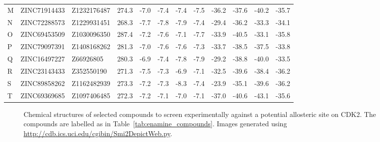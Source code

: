 \begin{sidewaystable}
\begin{small}
\begin{tabular}{lllrrrrrrrrr}
M     & ZINC71914433 & Z1232176487 & 274.3 & -7.0  & -7.4  & -7.4  & -7.5  & -36.2 & -37.6 & -40.2 & -35.7 \\
N     & ZINC72288573 & Z1229931451 & 268.3 & -7.7  & -7.8  & -7.9  & -7.4  & -29.4 & -36.2 & -33.3 & -34.1 \\
O     & ZINC69453509 & Z1030096350 & 287.4 & -7.2  & -7.6  & -7.1  & -7.7  & -33.9 & -40.5 & -33.1 & -35.8 \\
P     & ZINC79097391 & Z1408168262 & 281.3 & -7.0  & -7.6  & -7.6  & -7.3  & -33.7 & -38.5 & -37.5 & -33.8 \\
Q     & ZINC16497227 & Z66926805 & 280.3 & -6.9  & -7.4  & -7.8  & -7.9  & -29.2 & -38.8 & -40.0 & -33.5 \\
R     & ZINC23143433 & Z352550190  & 271.3 & -7.5  & -7.3  & -6.9  & -7.1  & -32.5 & -39.6 & -38.4 & -36.2 \\
S     & ZINC89858262 & Z1162482939 & 273.3 & -7.2  & -7.3  & -8.3  & -7.4  & -23.9 & -35.1 & -39.6 & -36.2 \\
T     & ZINC69369685 & Z1097406485 & 272.3 & -7.2  & -7.1  & -7.0  & -7.1  & -37.0 & -40.6 & -43.1 & -35.6 \\
\hline
\end{tabular}
\end{small}

\caption{Selected compounds to screen experimentally against a potential allosteric site on CDK2.
ZINC12 ID is the ID in the ZINC12 database (\url{http://zinc.docking.org/}).
Enamine ID is the ID at Enamine Ltd (\url{http://www.enamine.net}).
The AutoDock vina best energy and DOCK best grid score are shown for each ligand docked to four structures:
(A) 3PXF,
(B) 4EZ7,
(C) ExProSE pocket open structure from 3PXF,
(D) ExProSE pocket open structure from 4EZ7.}

\label{tab:enamine_compounds}
\end{sidewaystable}


\begin{figure}
\centering


\caption{Chemical structures of selected compounds to screen experimentally against a potential allosteric site on CDK2.
The compounds are labelled as in Table~\ref{tab:enamine_compounds}.
Images generated using \url{http://cdb.ics.uci.edu/cgibin/Smi2DepictWeb.py}.}

\label{fig:compound_structures}
\end{figure}


